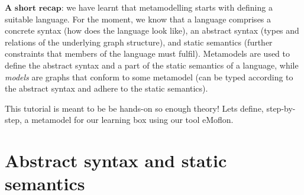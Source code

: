 $\textbf{A short recap:}$  we have learnt that metamodelling starts with defining a suitable language.
For the moment, we know that a language comprises a concrete syntax (how does the language look like),  an abstract syntax (types and relations of the underlying graph structure), and static semantics (further constraints that members of the language must fulfil).
Metamodels are used to define the abstract syntax and a part of the static semantics of a language, while \emph{models} are graphs that conform to some
metamodel (can be typed  according to the abstract syntax and adhere to the static semantics).

This tutorial is meant to be be hands-on so enough theory!
Lets define, step-by-step, a metamodel for our learning box using our tool eMoflon.

\section{Abstract syntax and static semantics}
\label{sec:abstractSyntax}

